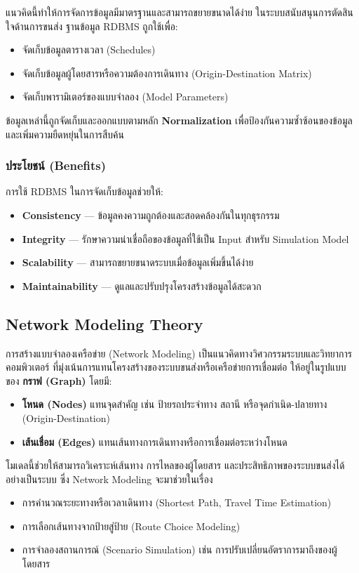แนวคิดนี้ทำให้การจัดการข้อมูลมีมาตรฐานและสามารถขยายขนาดได้ง่าย
ในระบบสนับสนุนการตัดสินใจด้านการขนส่ง ฐานข้อมูล RDBMS ถูกใช้เพื่อ:
\begin{itemize}
    \item จัดเก็บข้อมูลตารางเวลา (Schedules)
    \item จัดเก็บข้อมูลผู้โดยสารหรือความต้องการเดินทาง (Origin-Destination Matrix)
    \item จัดเก็บพารามิเตอร์ของแบบจำลอง (Model Parameters)
\end{itemize}
ข้อมูลเหล่านี้ถูกจัดเก็บและออกแบบตามหลัก \textbf{Normalization} 
เพื่อป้องกันความซ้ำซ้อนของข้อมูลและเพิ่มความยืดหยุ่นในการสืบค้น

\subsubsection{ประโยชน์ (Benefits)}
การใช้ RDBMS ในการจัดเก็บข้อมูลช่วยให้:
\begin{itemize}
    \item \textbf{Consistency} — ข้อมูลคงความถูกต้องและสอดคล้องกันในทุกธุรกรรม
    \item \textbf{Integrity} — รักษาความน่าเชื่อถือของข้อมูลที่ใช้เป็น Input สำหรับ Simulation Model
    \item \textbf{Scalability} — สามารถขยายขนาดระบบเมื่อข้อมูลเพิ่มขึ้นได้ง่าย
    \item \textbf{Maintainability} — ดูแลและปรับปรุงโครงสร้างข้อมูลได้สะดวก
\end{itemize}

\subsection{Network Modeling Theory}
การสร้างแบบจำลองเครือข่าย (Network Modeling) เป็นแนวคิดทางวิศวกรรมระบบและวิทยาการคอมพิวเตอร์ 
ที่มุ่งเน้นการแทนโครงสร้างของระบบขนส่งหรือเครือข่ายการเชื่อมต่อ 
ให้อยู่ในรูปแบบของ \textbf{กราฟ (Graph)} โดยมี:
\begin{itemize}
    \item \textbf{โหนด (Nodes)} แทนจุดสำคัญ เช่น ป้ายรถประจำทาง สถานี หรือจุดกำเนิด-ปลายทาง (Origin-Destination)
    \item \textbf{เส้นเชื่อม (Edges)} แทนเส้นทางการเดินทางหรือการเชื่อมต่อระหว่างโหนด
\end{itemize}
โมเดลนี้ช่วยให้สามารถวิเคราะห์เส้นทาง การไหลของผู้โดยสาร และประสิทธิภาพของระบบขนส่งได้อย่างเป็นระบบ
ซึ่ง Network Modeling จะมาช่วยในเรื่อง
\begin{itemize}
    \item การคำนวณระยะทางหรือเวลาเดินทาง (Shortest Path, Travel Time Estimation)
    \item การเลือกเส้นทางจากป้ายสู่ป้าย (Route Choice Modeling)
    \item การจำลองสถานการณ์ (Scenario Simulation) เช่น การปรับเปลี่ยนอัตราการมาถึงของผู้โดยสาร
\end{itemize}

